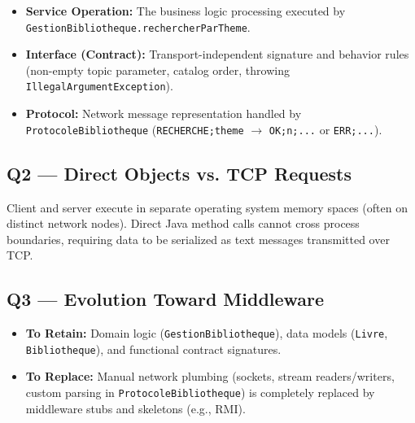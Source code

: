 \begin{itemize}[leftmargin=*]
  \item \textbf{Service Operation:} The business logic processing executed by \texttt{GestionBibliotheque.rechercherParTheme}.
  \item \textbf{Interface (Contract):} Transport-independent signature and behavior rules (non-empty topic parameter, catalog order, throwing \texttt{IllegalArgumentException}).
  \item \textbf{Protocol:} Network message representation handled by \texttt{ProtocoleBibliotheque} (\texttt{RECHERCHE;theme} $\rightarrow$ \texttt{OK;n;...} or \texttt{ERR;...}).
\end{itemize}

\subsection{Q2 --- Direct Objects vs. TCP Requests}

Client and server execute in separate operating system memory spaces (often on distinct network nodes). Direct Java method calls cannot cross process boundaries, requiring data to be serialized as text messages transmitted over TCP.

\subsection{Q3 --- Evolution Toward Middleware}

\begin{itemize}[leftmargin=*]
  \item \textbf{To Retain:} Domain logic (\texttt{GestionBibliotheque}), data models (\texttt{Livre}, \texttt{Bibliotheque}), and functional contract signatures.
  \item \textbf{To Replace:} Manual network plumbing (sockets, stream readers/writers, custom parsing in \texttt{ProtocoleBibliotheque}) is completely replaced by middleware stubs and skeletons (e.g., RMI).
\end{itemize}